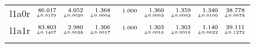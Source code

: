 \documentclass[a4paper,UKenglish]{lipics-v2016}
\begin{document}
\begin{table*}[t]
\begin{adjustbox}{width=1.2\textwidth,center}
\begin{tabular}{lrrrrrrrr}
l1a0r&$\substack{\mathmakebox[.7cm][r]{86.017}\\{\mathmakebox[.7cm][r]{\scriptscriptstyle \pm 0.0179}}}$&$\substack{\mathmakebox[.7cm][r]{4.052}\\{\mathmakebox[.7cm][r]{\scriptscriptstyle \pm 0.0020}}}$&$\substack{\mathmakebox[.7cm][r]{1.368}\\{\mathmakebox[.7cm][r]{\scriptscriptstyle \pm 0.0004}}}$&$\substack{\mathmakebox[.7cm][r]{1.000}\\{\mathmakebox[.7cm][r]{\scriptscriptstyle }}}$&$\substack{\mathmakebox[.7cm][r]{1.360}\\{\mathmakebox[.7cm][r]{\scriptscriptstyle \pm 0.0003}}}$&$\substack{\mathmakebox[.7cm][r]{1.359}\\{\mathmakebox[.7cm][r]{\scriptscriptstyle \pm 0.0003}}}$&$\substack{\mathmakebox[.7cm][r]{1.340}\\{\mathmakebox[.7cm][r]{\scriptscriptstyle \pm 0.0106}}}$&$\substack{\mathmakebox[.7cm][r]{38.778}\\{\mathmakebox[.7cm][r]{\scriptscriptstyle \pm 0.0078}}}$\\
\addlinespace
l1a1r&$\substack{\mathmakebox[.7cm][r]{83.803}\\{\mathmakebox[.7cm][r]{\scriptscriptstyle \pm 0.1407}}}$&$\substack{\mathmakebox[.7cm][r]{2.980}\\{\mathmakebox[.7cm][r]{\scriptscriptstyle \pm 0.0038}}}$&$\substack{\mathmakebox[.7cm][r]{1.306}\\{\mathmakebox[.7cm][r]{\scriptscriptstyle \pm 0.0017}}}$&$\substack{\mathmakebox[.7cm][r]{1.000}\\{\mathmakebox[.7cm][r]{\scriptscriptstyle }}}$&$\substack{\mathmakebox[.7cm][r]{1.303}\\{\mathmakebox[.7cm][r]{\scriptscriptstyle \pm 0.0016}}}$&$\substack{\mathmakebox[.7cm][r]{1.303}\\{\mathmakebox[.7cm][r]{\scriptscriptstyle \pm 0.0016}}}$&$\substack{\mathmakebox[.7cm][r]{1.140}\\{\mathmakebox[.7cm][r]{\scriptscriptstyle \pm 0.0022}}}$&$\substack{\mathmakebox[.7cm][r]{39.111}\\{\mathmakebox[.7cm][r]{\scriptscriptstyle \pm 0.1272}}}$\\
\addlinespace

\end{tabular}
\end{adjustbox}
\end{table*}
\end{document}
